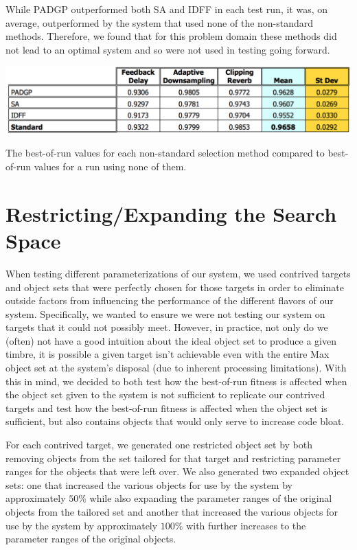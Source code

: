\documentclass[12pt]{report} 	%
\numberwithin{figure}{chapter}
\numberwithin{table}{chapter}
\numberwithin{equation}{chapter}
\begin{document}
\begin{flushleft}
While PADGP outperformed both SA and IDFF in each test run, it was, on average, outperformed by the system that used none of the non-standard methods. Therefore, we found that for this problem domain these methods did not lead to an optimal system and so were not used in testing going forward.
\begin{table}[h!]
\vspace{30pt}
\begin{center}
\includegraphics[scale=0.6,width=\linewidth]{NonStandardSelectionTable}
\caption[Non-standard selection best-of-run values]{The best-of-run values for each non-standard selection method compared to best-of-run values for a run using none of them.}
\end{center}
\end{table}
\vspace{-12pt}
\section{Restricting/Expanding the Search Space}
When testing different parameterizations of our system, we used contrived targets and object sets that were perfectly chosen for those targets in order to eliminate outside factors from influencing the performance of the different flavors of our system. Specifically, we wanted to ensure we were not testing our system on targets that it could not possibly meet. However, in practice, not only do we (often) not have a good intuition about the ideal object set to produce a given timbre, it is possible a given target isn't achievable even with the entire Max object set at the system's disposal (due to inherent processing limitations). With this in mind, we decided to both test how the best-of-run fitness is affected when the object set given to the system is not sufficient to replicate our contrived targets and test how the best-of-run fitness is affected when the object set is sufficient, but also contains objects that would only serve to increase code bloat.

For each contrived target, we generated one restricted object set by both removing objects from the set tailored for that target and restricting parameter ranges for the objects that were left over. We also generated two expanded object sets: one that increased the various objects for use by the system by approximately $50\%$ while also expanding the parameter ranges of the original objects from the tailored set and another that increased the various objects for use by the system by approximately $100\%$ with further increases to the parameter ranges of the original objects.


\end{flushleft}
\end{document}
